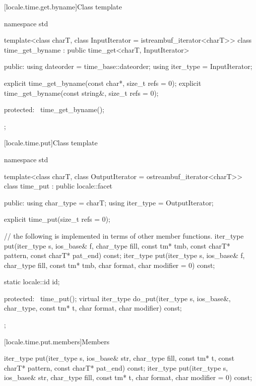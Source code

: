 [locale.time.get.byname]{Class template }

%
\begin{codeblock}
namespace std {
  template<class charT, class InputIterator = istreambuf_iterator<charT>>
    class time_get_byname : public time_get<charT, InputIterator> {
    public:
      using dateorder = time_base::dateorder;
      using iter_type = InputIterator;

      explicit time_get_byname(const char*, size_t refs = 0);
      explicit time_get_byname(const string&, size_t refs = 0);

    protected:
      ~time_get_byname();
    };
}
\end{codeblock}

[locale.time.put]{Class template }

%
\begin{codeblock}
namespace std {
  template<class charT, class OutputIterator = ostreambuf_iterator<charT>>
    class time_put : public locale::facet {
    public:
      using char_type = charT;
      using iter_type = OutputIterator;

      explicit time_put(size_t refs = 0);

      // the following is implemented in terms of other member functions.
      iter_type put(iter_type s, ios_base& f, char_type fill, const tm* tmb,
                    const charT* pattern, const charT* pat_end) const;
      iter_type put(iter_type s, ios_base& f, char_type fill,
                    const tm* tmb, char format, char modifier = 0) const;

      static locale::id id;

    protected:
      ~time_put();
      virtual iter_type do_put(iter_type s, ios_base&, char_type, const tm* t,
                               char format, char modifier) const;
    };
}
\end{codeblock}

[locale.time.put.members]{Members}

%
\begin{itemdecl}
iter_type put(iter_type s, ios_base& str, char_type fill, const tm* t,
              const charT* pattern, const charT* pat_end) const;
iter_type put(iter_type s, ios_base& str, char_type fill, const tm* t,
              char format, char modifier = 0) const;
\end{itemdecl}

